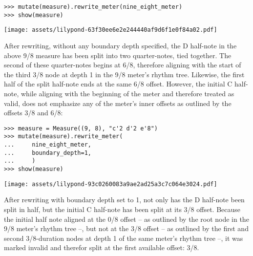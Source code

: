 \begin{singlespacing}
\vspace{-0.5\baselineskip}
\begin{lstlisting}
>>> mutate(measure).rewrite_meter(nine_eight_meter)
>>> show(measure)
\end{lstlisting}
\noindent\texttt{[image: assets/lilypond-63f30ee6e2e244440af9d6f1e0f84a02.pdf]}
\end{singlespacing}

\noindent After rewriting, without any boundary depth specified, the D
half-note in the above 9/8 measure has been split into two quarter-notes, tied
together. The second of these quarter-notes begins at 6/8, therefore aligning
with the start of the third 3/8 node at depth 1 in the 9/8 meter's rhythm tree.
Likewise, the first half of the split half-note ends at the same 6/8 offset.
However, the initial C half-note, while aligning with the beginning of the
meter and therefore treated as valid, does not emphasize any of the meter's
inner offsets as outlined by the offsets 3/8 and 6/8:

\begin{comment}
<abjad>
measure = Measure((9, 8), "c'2 d'2 e'8")
mutate(measure).rewrite_meter(
    nine_eight_meter,
    boundary_depth=1,
    )
show(measure)
</abjad>
\end{comment}

\begin{singlespacing}
\vspace{-0.5\baselineskip}
\begin{lstlisting}
>>> measure = Measure((9, 8), "c'2 d'2 e'8")
>>> mutate(measure).rewrite_meter(
...     nine_eight_meter,
...     boundary_depth=1,
...     )
>>> show(measure)
\end{lstlisting}
\noindent\texttt{[image: assets/lilypond-93c0260083a9ae2ad25a3c7c064e3024.pdf]}
\end{singlespacing}

\noindent After rewriting with boundary depth set to 1, not only has the D
half-note been split in half, but the initial C half-note has been split at its
3/8 offset. Because the initial half note aligned at the 0/8 offset -- as
outlined by the root node in the 9/8 meter's rhythm tree --, but not at the 3/8
offset -- as outlined by the first and second 3/8-duration nodes at depth 1 of
the same meter's rhythm tree --, it was marked invalid and therefor split at
the first available offset: 3/8.

